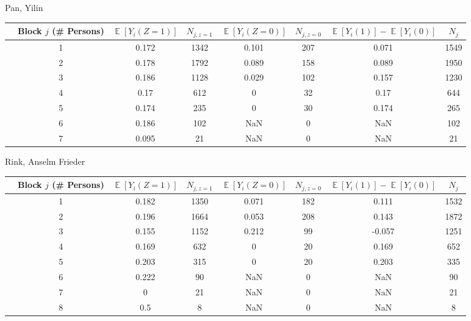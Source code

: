 \documentclass[11pt,notitlepage]{article}
\def\E{\mathop{\mathbb{E}}}
\begin{document}
Pan, Yilin


\begin{table}[h!]\small
\begin{center}
\begin{tabular}{rc|cc|cc|cc}
  \hline
 & Block $j$ (\# Persons) & $\E[Y_i(Z=1)]$ & $N_{j, z=1}$ & $\E[Y_i(Z=0)]$ & $N_{j, z=0}$ & $\E[Y_i(1)]-\E[Y_i(0)]$ & $N_j$ \\ 
  \hline
 & 1 & 0.172 & 1342 & 0.101 & 207 & 0.071 & 1549 \\ 
 & 2 & 0.178 & 1792 & 0.089 & 158 & 0.089 & 1950 \\ 
 & 3 & 0.186 & 1128 & 0.029 & 102 & 0.157 & 1230 \\ 
 & 4 & 0.17 & 612 & 0 & 32 & 0.17 & 644 \\ 
 & 5 & 0.174 & 235 & 0 & 30 & 0.174 & 265 \\ 
 & 6 & 0.186 & 102 & NaN & 0 & NaN & 102 \\ 
 & 7 & 0.095 & 21 & NaN & 0 & NaN & 21 \\ 
   \hline
\end{tabular}
\end{center}
\end{table}


\clearpage


Rink, Anselm Frieder


\begin{table}[h!]\small
\begin{center}
\begin{tabular}{rc|cc|cc|cc}
  \hline
 & Block $j$ (\# Persons) & $\E[Y_i(Z=1)]$ & $N_{j, z=1}$ & $\E[Y_i(Z=0)]$ & $N_{j, z=0}$ & $\E[Y_i(1)]-\E[Y_i(0)]$ & $N_j$ \\ 
  \hline
   & 1 & 0.182 & 1350 & 0.071 & 182 & 0.111 & 1532 \\ 
   & 2 & 0.196 & 1664 & 0.053 & 208 & 0.143 & 1872 \\ 
   & 3 & 0.155 & 1152 & 0.212 & 99 & -0.057 & 1251 \\ 
   & 4 & 0.169 & 632 & 0 & 20 & 0.169 & 652 \\ 
   & 5 & 0.203 & 315 & 0 & 20 & 0.203 & 335 \\ 
   & 6 & 0.222 & 90 & NaN & 0 & NaN & 90 \\ 
   & 7 & 0 & 21 & NaN & 0 & NaN & 21 \\ 
   & 8 & 0.5 & 8 & NaN & 0 & NaN & 8 \\ 
   \hline
\end{tabular}
\end{center}
\end{table}
\end{document}
